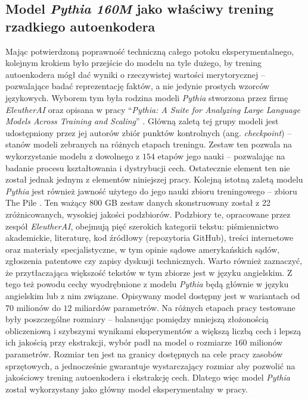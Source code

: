   \subsection{Model \textit{Pythia 160M} jako właściwy trening rzadkiego autoenkodera}
  Mając potwierdzoną poprawność techniczną całego potoku eksperymentalnego, kolejnym krokiem było przejście do modelu na tyle dużego, by trening autoenkodera mógł dać wyniki o rzeczywistej wartości merytorycznej -- pozwalające badać reprezentację faktów, a nie jedynie prostych wzorców językowych. Wyborem tym była rodzina modeli \textit{Pythia} stworzona przez firmę \textit{EleutherAI} oraz opisana w pracy \enquote{\textit{Pythia: A Suite for Analyzing Large Language Models Across Training and Scaling}} \cite{biderman_2023_pythia_suite_analyzing_large}. Główną zaletą tej grupy modeli jest udostępniony przez jej autorów zbiór punktów kontrolnych (ang. \textit{checkpoint}) -- stanów modeli zebranych na różnych etapach treningu. Zestaw ten pozwala na wykorzystanie modelu z dowolnego z $154$ etapów jego nauki -- pozwalając na badanie procesu kształtowania i dystrybucji cech. Ostatecznie element ten nie został jednak jednym z elementów niniejszej pracy. \newline
  Kolejną istotną zaletą modelu \textit{Pythia} jest również jawność użytego do jego nauki zbioru treningowego -- zbioru The Pile \cite{gao_2020_pile_800gb_dataset_diverse}. Ten ważący $800$ GB zestaw danych skonstruowany został z 22 zróżnicowanych, wysokiej jakości podzbiorów. Podzbiory te, opracowane przez zespół \textit{EleutherAI}, obejmują pięć szerokich kategorii tekstu: piśmiennictwo akademickie, literaturę, kod źródłowy (repozytoria GitHub), treści internetowe oraz materiały specjalistyczne, w tym opinie sądowe amerykańskich sądów, zgłoszenia patentowe czy zapisy dyskusji technicznych. Warto również zaznaczyć, że przytłaczająca większość tekstów w tym zbiorze jest w języku angielskim. Z tego też powodu cechy wyodrębnione z modelu \textit{Pythia} będą głównie w języku angielskim lub z nim związane. \newline
  Opisywany model dostępny jest w wariantach od $70$ milionów do $12$ miliardów parametrów. Na różnych etapach pracy testowane były poszczególne rozmiary -- balansując pomiędzy mniejszą złożonością obliczeniową i szybszymi wynikami eksperymentów a większą liczbą cech i lepszą ich jakością przy ekstrakcji, wybór padł na model o rozmiarze $160$ milionów parametrów. Rozmiar ten jest na granicy dostępnych na cele pracy zasobów sprzętowych, a jednocześnie gwarantuje wystarczający rozmiar aby pozwolić na jakościowy trening autoenkodera i ekstrakcję cech. Dlatego więc model \textit{Pythia} został wykorzystany jako główny model eksperymentalny w pracy. \newline
